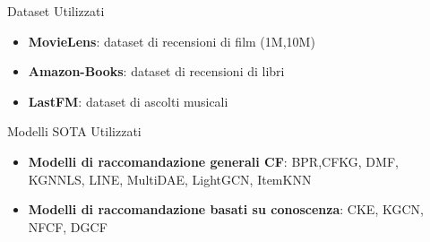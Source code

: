 \begin{frame}{Dataset Utilizzati}
    \begin{itemize}
        \item \textbf{MovieLens}: dataset di recensioni di film (1M,10M)
        \item \textbf{Amazon-Books}: dataset di recensioni di libri
        \item \textbf{LastFM}: dataset di ascolti musicali
    \end{itemize}
\end{frame}

\begin{frame}{Modelli SOTA Utilizzati}
    \begin{itemize}
        \item \textbf{Modelli di raccomandazione generali CF}: BPR,CFKG, DMF, KGNNLS, LINE, MultiDAE, LightGCN, ItemKNN
        \item \textbf{Modelli di raccomandazione basati su conoscenza}: CKE, KGCN, NFCF, DGCF
    \end{itemize}
\end{frame}

